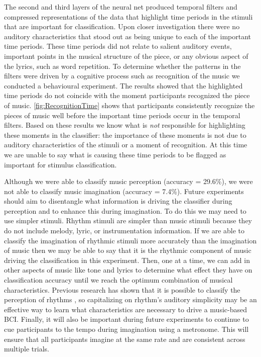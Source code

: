 The second and third layers of the neural net produced temporal filters and compressed representations of the data that highlight time periods in the stimuli that are important for classification. 
Upon closer investigation there were no auditory characteristics that stood out as being unique to each of the important time periods.
These time periods did not relate to salient auditory events, important points in the musical structure of the piece, or any obvious aspect of the lyrics, such as word repetition. 
To determine whether the patterns in the filters were driven by a cognitive process such as recognition of the music we conducted a behavioural experiment.
The results showed that the highlighted time periods do not coincide with the moment participants recognized the piece of music. 
\autoref{fig:RecognitionTime} shows that participants consistently recognize the pieces of music well before the important time periods occur in the temporal filters. 
Based on these results we know what is \emph{not} responsible for highlighting these moments in the classifier: the importance of these moments is not due to auditory characteristics of the stimuli or a moment of recognition.
At this time we are unable to say what is causing these time periods to be flagged as important for stimulus classification. 

Although we were able to classify music perception (accuracy = 29.6\%), we were not able to classify music imagination (accuracy = 7.4\%).
Future experiments should aim to disentangle what information is driving the classifier during perception and to enhance this during imagination.
To do this we may need to use simpler stimuli.
Rhythm stimuli are simpler than music stimuli because they do not include melody, lyric, or instrumentation information. 
If we are able to classify the imagination of rhythmic stimuli more accurately than the imagination of music then we may be able to say that it is the rhythmic component of music driving the classification in this experiment.
Then, one at a time, we can add in other aspects of music like tone and lyrics to determine what effect they have on classification accuracy until we reach the optimum combination of musical characteristics.
Previous research has shown that it is possible to classify the perception of rhythms \cite{stober2014audiomostly}, so capitalizing on rhythm's auditory simplicity may be an effective way to learn what characteristics are necessary to drive a music-based \ac{BCI}.
Finally, it will also be important during future experiments to continue to cue participants to the tempo during imagination using a metronome.
This will ensure that all participants imagine at the same rate and are consistent across multiple trials.